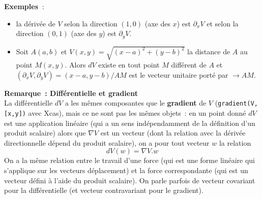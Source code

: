\documentclass[a4paper,11pt]{article}
\begin{document}
\begin{giacjshere}
{\bf Exemples~}: 
\begin{itemize}
\item la d\'eriv\'ee de $V$ selon la direction $(1,0)$ (axe des $x$)
est $\partial_xV$ et selon la direction $(0,1)$ (axe des $y$)
est $\partial_y V$.
\item Soit $A(a,b)$ et $V(x,y)=\sqrt{(x-a)^2+(y-b)^2}$ 
la distance de $A$ au point $M(x,y)$.
Alors $dV$ existe en tout point $M$ diff\'erent de $A$
et $(\partial_x V,\partial_y V)=(x-a,y-b)/AM$ est le vecteur
unitaire port\'e par $\rightarrow{AM}$.
\end{itemize}

{\bf Remarque~: Diff\'erentielle et gradient}\\
La diff\'erentielle $dV$ a les m\^emes composantes que
le {\bf gradient} de $V$ (\verb|gradient(V,[x,y])| avec Xcas), 
mais ce ne sont pas les m\^emes objets~: 
en un point donn\'e
$dV$ est une application lin\'eaire (qui a un sens ind\'ependamment
de la d\'efinition d'un produit scalaire)
alors que $\nabla V$ est un vecteur (dont la relation
avec la d\'eriv\'ee directionnelle d\'epend du produit scalaire), 
on a pour tout vecteur $w$ la relation 
$$dV(w)=\nabla V. w $$
On a la m\^eme relation entre le travail d'une force (qui est une
forme lin\'eaire qui s'applique sur les vecteurs d\'eplacement) 
et la force correspondante (qui est un vecteur
d\'efini \`a l'aide du produit scalaire). On parle parfois de vecteur
covariant pour la diff\'erentielle (et vecteur contravariant pour le
gradient).


\end{giacjshere}
\end{document}
